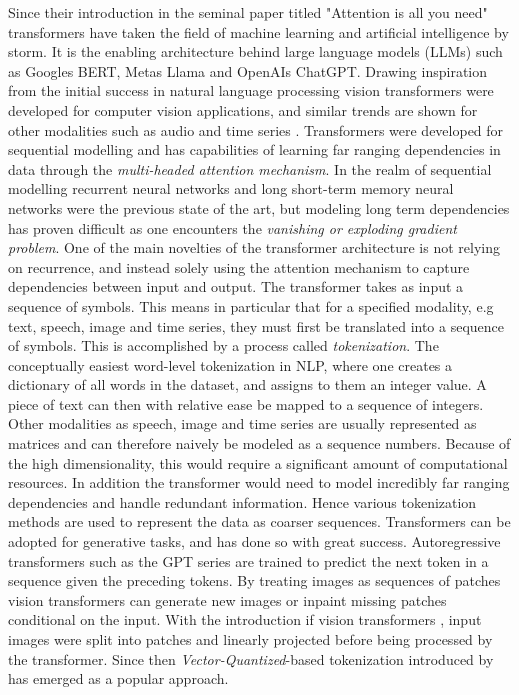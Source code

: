 \documentclass[../../thesis.tex]{subfiles}
\begin{document}
Since their introduction in the seminal paper titled "Attention is all you need"\cite{vaswani2023attention} transformers have taken the field of machine learning and artificial intelligence by storm. It is the enabling architecture behind large language models (LLMs) such as Googles BERT, Metas Llama and OpenAIs ChatGPT. Drawing inspiration from the initial success in natural language processing vision transformers \cite{dosovitskiy2021image} were developed for computer vision applications, and similar trends are shown for other modalities such as audio \cite{latif2023transformers} and time series \cite{wen2023transformers}. \newline
Transformers were developed for sequential modelling and has capabilities of learning far ranging dependencies in data through the \textit{multi-headed attention mechanism}. In the realm of sequential modelling recurrent neural networks  and long short-term memory neural networks were the previous state of the art, but modeling long term dependencies has proven difficult \cite{279181} as one encounters the \textit{vanishing or exploding gradient problem}. One of the main novelties of the transformer architecture is not relying on recurrence, and instead solely using the attention mechanism to capture dependencies between input and output.
\newline
The transformer takes as input a sequence of symbols. This means in particular that for a specified modality, e.g text, speech, image and time series, they must first be translated into a sequence of symbols. This is accomplished by a process called \textit{tokenization}. The conceptually easiest word-level tokenization in NLP, where one creates a dictionary of all words in the dataset, and assigns to them an integer value. A piece of text can then with relative ease be mapped to a sequence of integers. Other modalities as speech, image and time series are usually represented as matrices and can therefore naively be modeled as a sequence numbers. Because of the high dimensionality, this would require a significant amount of computational resources. In addition the transformer would need to model incredibly far ranging dependencies and handle redundant information. Hence various tokenization methods are used to represent the data as coarser sequences. 
\newline
Transformers can be adopted for generative tasks, and has done so with great success. Autoregressive transformers such as the GPT series are trained to predict the next token in a sequence given the preceding tokens. By treating images as sequences of patches vision transformers can generate new images or inpaint missing patches conditional on the input. With the introduction if vision transformers \cite{dosovitskiy2021image}, input images were split into patches and linearly projected before being processed by the transformer. Since then \textit{Vector-Quantized}-based tokenization introduced by \cite{VQVAE} has emerged as a popular approach.
\end{document}

